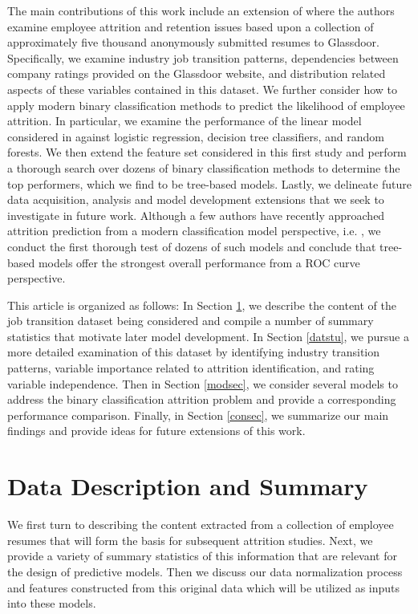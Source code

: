 \documentclass[10pt]{article}
\begin{document}
The main contributions of this work include an extension of \cite{Smart2016} where the authors 
examine employee 
attrition and retention issues based upon 
a collection of approximately five thousand anonymously submitted resumes to Glassdoor.  
Specifically, we examine industry job transition patterns, dependencies between company ratings 
provided on the Glassdoor website, and distribution related aspects of these variables 
contained in this dataset.  We further consider how to apply modern binary classification 
methods to predict the likelihood of employee attrition.  In particular, we examine the 
performance of the linear model considered in \cite{Smart2016} against logistic regression, 
decision tree classifiers, and random forests.  We then extend the feature set considered in this 
first study 
and perform a thorough search over dozens of binary classification methods to determine 
the top performers, which we find to be tree-based models.
 Lastly, we delineate 
future data acquisition, analysis and model development extensions that we seek to investigate 
in future work. Although a few authors have recently approached attrition prediction 
from a modern classification model perspective, i.e. \cite{Alao2013,Fri2018, Naga}, we conduct the first 
thorough test of dozens of such models and conclude that tree-based models offer the strongest 
overall performance from a ROC curve perspective.

This article is organized as follows: In Section \ref{datsec}, we describe the content 
of the job transition dataset being considered and compile a number of 
summary statistics that motivate later model development.  In Section \ref{datstu},
we pursue a more detailed examination of this dataset by identifying industry transition 
patterns, variable importance related to attrition identification, and 
rating variable independence.  Then in Section \ref{modsec}, we consider several 
models to address the binary classification attrition problem and provide a 
corresponding performance comparison.  Finally, in Section \ref{consec}, we 
summarize our main findings and provide ideas for future extensions of this work.

\section{Data Description and Summary} \label{datsec}

We first turn to describing the content extracted from a collection of 
employee resumes that will form the basis for subsequent attrition studies. 
Next, we provide a variety of summary statistics of this information that 
are relevant for the design of predictive models.  Then we discuss 
our data normalization process and 
features constructed from this original data which will be utilized 
as inputs into these models.
\end{document}
